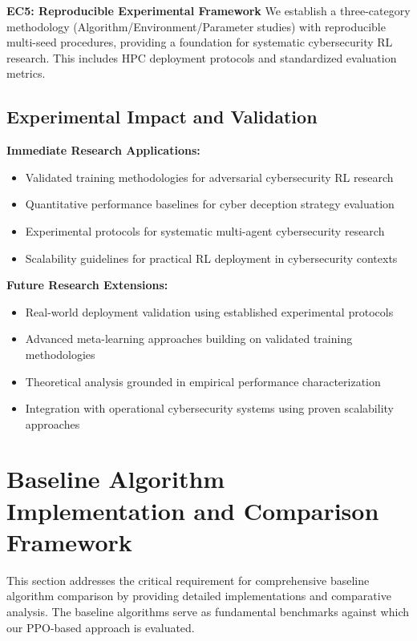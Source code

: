 \documentclass[12pt]{article}
\theoremstyle{definition}
\theoremstyle{plain}
\begin{document}
\textbf{EC5: Reproducible Experimental Framework}
We establish a three-category methodology (Algorithm/Environment/Parameter studies) with reproducible multi-seed procedures, providing a foundation for systematic cybersecurity RL research. This includes HPC deployment protocols and standardized evaluation metrics.

\subsection{Experimental Impact and Validation}

\textbf{Immediate Research Applications:}
\begin{itemize}
\item Validated training methodologies for adversarial cybersecurity RL research
\item Quantitative performance baselines for cyber deception strategy evaluation  
\item Experimental protocols for systematic multi-agent cybersecurity research
\item Scalability guidelines for practical RL deployment in cybersecurity contexts
\end{itemize}

\textbf{Future Research Extensions:}
\begin{itemize}
\item Real-world deployment validation using established experimental protocols
\item Advanced meta-learning approaches building on validated training methodologies
\item Theoretical analysis grounded in empirical performance characterization
\item Integration with operational cybersecurity systems using proven scalability approaches
\end{itemize}

\section{Baseline Algorithm Implementation and Comparison Framework}

This section addresses the critical requirement for comprehensive baseline algorithm comparison by providing detailed implementations and comparative analysis. The baseline algorithms serve as fundamental benchmarks against which our PPO-based approach is evaluated.
\end{document}
